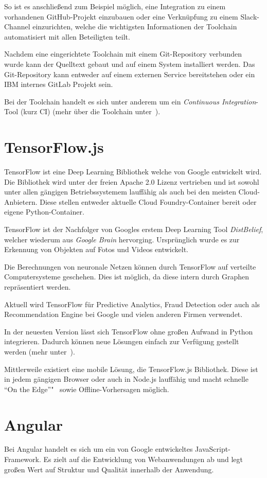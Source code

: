 So ist es anschließend zum Beispiel möglich, eine Integration zu einem vorhandenen GitHub-Projekt einzubauen oder eine
Verknüpfung zu einem Slack-Channel einzurichten, welche die wichtigsten Informationen der Toolchain automatisiert
mit allen Beteiligten teilt.

Nachdem eine eingerichtete Toolchain mit einem Git-Repository verbunden wurde kann der Quelltext gebaut und auf einem
System installiert werden. Das Git-Repository kann entweder auf einem externen Service bereitstehen oder ein IBM
internes GitLab Projekt sein.

Bei der Toolchain handelt es sich unter anderem um ein \textit{Continuous Integration}-Tool (kurz CI)
(mehr über die Toolchain unter~\cite{online_grundlagen_toolchain}).

\section{TensorFlow.js}
TensorFlow ist eine Deep Learning Bibliothek welche von Google entwickelt wird. Die Bibliothek wird unter der freien
Apache 2.0 Lizenz vertrieben und ist sowohl unter allen gängigen Betriebssystemem lauffähig als auch bei den meisten
Cloud-Anbietern. Diese stellen entweder aktuelle Cloud Foundry-Container bereit oder eigene Python-Container.

TensorFlow ist der Nachfolger von Googles erstem Deep Learning Tool \textit{DistBelief}, welcher wiederum aus
\textit{Google Brain} hervorging. Ursprünglich wurde es zur Erkennung von Objekten auf Fotos und Videos entwickelt.

Die Berechnungen von neuronale Netzen können durch TensorFlow auf verteilte Computersysteme geschehen. Dies ist möglich,
da diese intern durch Graphen repräsentiert werden.

Aktuell wird TensorFlow für Predictive Analytics, Fraud Detection oder auch als Recommendation Engine bei Google und
vielen anderen Firmen verwendet.

In der neuesten Version lässt sich TensorFlow ohne großen Aufwand in Python integrieren. Dadurch können neue Lösungen
einfach zur Verfügung gestellt werden (mehr unter~\cite{book_grundlagen_tensorflow}).

Mittlerweile existiert eine mobile Lösung, die TensorFlow.js Bibliothek. Diese ist in jedem gängigen Browser oder auch
in Node.js lauffähig und macht schnelle \enquote{On the Edge}"~ sowie Offline-Vorhersagen möglich.

\section{Angular}
Bei Angular handelt es sich um ein von Google entwickeltes JavaScript-Framework. Es zielt auf die Entwicklung von
Webanwendungen ab und legt großen Wert auf Struktur und Qualität innerhalb der Anwendung.

